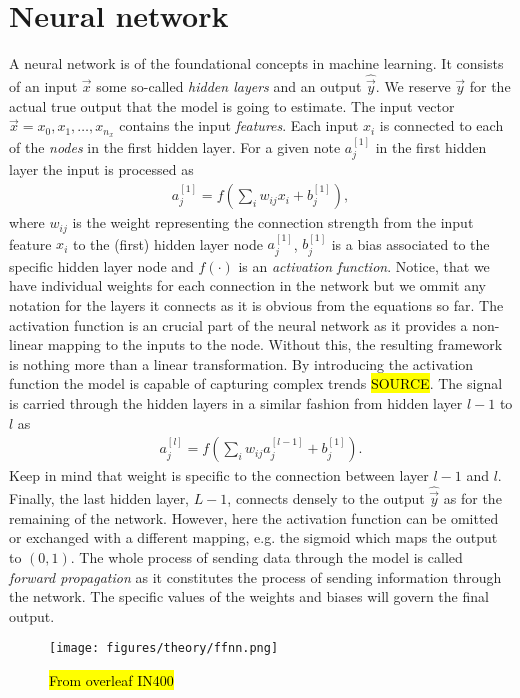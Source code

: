 \section{Neural network}
A neural network is of the foundational concepts in machine learning. It consists of an input $\vec{x}$ some so-called \textit{hidden layers} and an output $\hat{\vec{y}}$. We reserve $\vec{y}$ for the actual true output that the model is going to estimate. The input vector $\vec{x} = x_0, x_1, \ldots, x_{n_x}$ contains the input \textit{features}. Each input $x_i$ is connected to each of the \textit{nodes} in the first hidden layer. For a given note $a_j^{[1]}$ in the first hidden layer the input is processed as
\begin{align*}
  a_j^{[1]} = f(\sum_i w_{ij}x_i + b_j^{[1]}),
\end{align*}
where $w_{ij}$ is the weight representing the connection strength from the input feature $x_i$ to the (first) hidden layer node $a_j^{[1]}$, $b_j^{[1]}$ is a bias associated to the specific hidden layer node and  $f(\cdot)$ is an \textit{activation function}. Notice, that we have individual weights for each connection in the network but we ommit any notation for the layers it connects as it is obvious from the equations so far. The activation function is an crucial part of the neural network as it provides a non-linear mapping to the inputs to the node. Without this, the resulting framework is nothing more than a linear transformation. By introducing the activation function the model is capable of capturing complex trends \hl{SOURCE}. The signal is carried through the hidden layers in a similar fashion from hidden layer $l-1$ to $l$ as 
\begin{align*}
  a_j^{[l]} = f\left(\sum_i w_{ij}a_j^{[l-1]} + b_j^{[1]}\right).
\end{align*}
Keep in mind that weight is specific to the connection between layer $l-1$ and $l$. Finally, the last hidden layer, $L-1$, connects densely to the output $\hat{\vec{y}}$ as for the remaining of the network. However, here the activation function can be omitted or exchanged with a different mapping, e.g. the sigmoid which maps the output to $(0,1)$. The whole process of sending data through the model is called \textit{forward propagation} as it constitutes the process of sending information through the network. The specific values of the weights and biases will govern the final output.

\begin{figure}[H]
  \centering
  \texttt{[image: figures/theory/ffnn.png]}
  \caption{\hl{From overleaf IN400}}
  \label{fig:ffnn}
\end{figure}

